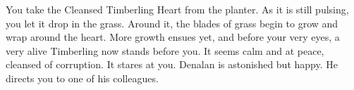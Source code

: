 
You take the Cleansed Timberling Heart from the planter. As it is still pulsing, you let it drop in the grass. Around it, the blades of grass begin to grow and wrap around the heart. More growth ensues yet, and before your very eyes, a very alive Timberling now stands before you. It seems calm and at peace, cleansed of corruption. It stares at you. Denalan is astonished but happy. He directs you to one of his colleagues.

